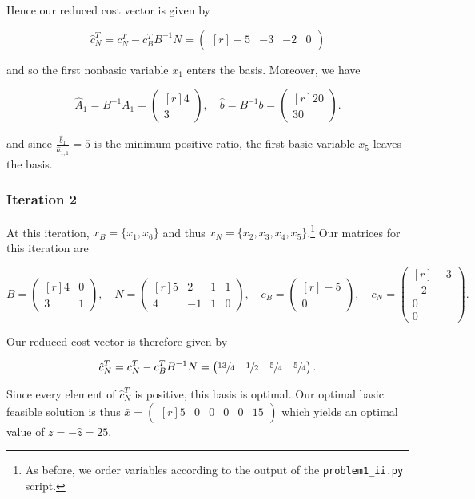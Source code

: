 \begin{solution}
  Hence our reduced cost vector is given by 

  $$
  \hat{c}_N^T = c_N^T - c_B^T B^{-1} N = \begin{pmatrix*}[r]
    -5 & -3 & -2 & 0
  \end{pmatrix*}
  $$

  and so the first nonbasic variable $x_1$ enters the basis. Moreover, we have
  
  $$
  \hat{A}_1 = B^{-1} A_1 = \begin{pmatrix*}[r]
    4  \\
    3
  \end{pmatrix*}, \quad \hat{b} = B^{-1} b = \begin{pmatrix*}[r]
    20 \\
    30 
  \end{pmatrix*}.
  $$

  and since $\frac{\hat{b}_1}{\hat{a}_{1,1}} = 5$ is the minimum positive ratio, the first basic variable 
  $x_5$ leaves the basis.

  \pagebreak
  \subsubsection*{Iteration 2}
  At this iteration, $x_B = \{x_1, x_6\}$ and thus $x_N = \{x_2, x_3, x_4, x_5\}$.\footnote{
    As before, we order variables according to the output of the \texttt{problem1\_ii.py} script.
  }
  Our matrices for this iteration are

  $$
    B = \begin{pmatrix*}[r]
      4 & 0 \\
      3 & 1
    \end{pmatrix*}, \quad N = \begin{pmatrix*}[r]
      5 &  2 & 1 & 1 \\
      4 & -1 & 1 & 0
    \end{pmatrix*}, \quad c_B = \begin{pmatrix*}[r]
     -5 \\
      0 
    \end{pmatrix*}, \quad c_N = \begin{pmatrix*}[r]
     -3  \\
     -2  \\
      0  \\
      0
    \end{pmatrix*}.
  $$

  Our reduced cost vector is therefore given by 

  $$
  \hat{c}_N^T = c_N^T - c_B^T B^{-1} N = \begin{pmatrix*}[r]
     \sfrac{13}{4} & \sfrac{1}{2} & \sfrac{5}{4} & \sfrac{5}{4}
  \end{pmatrix*}.
  $$

  Since every element of $\hat{c}_N^T$ is positive, this basis is optimal. Our optimal basic feasible solution is thus
  $\bar{x} = \begin{pmatrix*}[r]
    5 & 0 & 0 & 0 & 0 & 15
  \end{pmatrix*}$ which yields an optimal value of $z = -\hat{z} = 25$.
  \ \\
\end{solution}